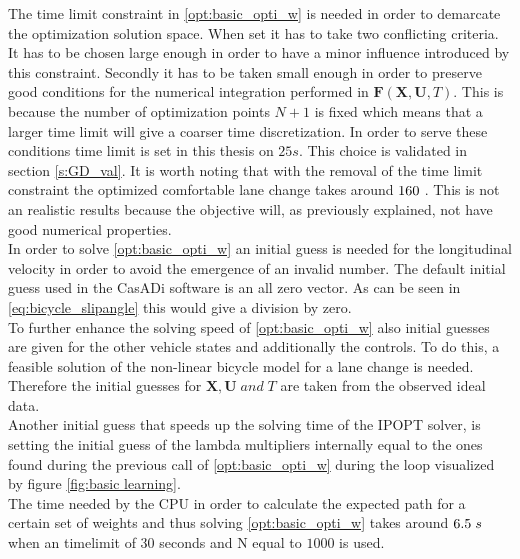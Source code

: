 The time limit constraint in \ref{opt:basic_opti_w} is needed in order to demarcate the optimization solution space. When set it has to take two conflicting criteria. It has to be chosen large enough in order to have a minor influence introduced by this constraint. Secondly it has to be taken small enough in order to preserve good conditions for the numerical integration performed in $\bm{F}(\bm{X},\bm{U}, T)$. This is because the number of optimization points $N+1$ is fixed which means that a larger time limit will give a coarser time discretization. In order to serve these conditions time limit is set in this thesis on $25 s$. This choice is validated in section \ref{s:GD_val}. It is worth noting that with the removal of the time limit constraint the optimized comfortable lane change takes around $160 \hspace{1mm}$. This is not an realistic results because the objective will, as previously explained, not have good numerical properties.\\ 

In order to solve \ref{opt:basic_opti_w} an initial guess is needed for the longitudinal velocity in order to avoid the emergence of an invalid number. The default initial guess used in the CasADi software is an all zero vector. As can be seen in \ref{eq:bicycle_slipangle} this would give a division by zero. \\
To further enhance the solving speed of \ref{opt:basic_opti_w} also initial guesses are given for the other vehicle states and additionally the controls. To do this, a feasible solution of the non-linear bicycle model for a lane change is needed. Therefore the initial guesses for $\bm{X}, \bm{U} \;and\; T$ are taken from the observed ideal data. \\

Another initial guess that speeds up the solving time of the IPOPT solver, is setting the initial guess of the lambda multipliers internally equal to the ones found during the previous call of \ref{opt:basic_opti_w} during the loop visualized by figure \ref{fig:basic learning}. \\

The time needed by the CPU in order to calculate the expected path for a certain set of weights and thus solving \ref{opt:basic_opti_w} takes around $6.5\hspace{1mm}s$ when an timelimit of $30$ seconds and N equal to $1000$ is used. 


